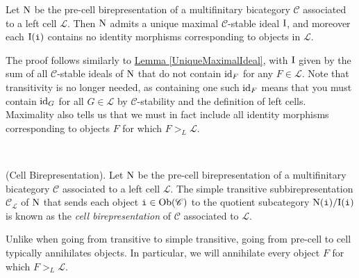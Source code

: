 \noindent\begin{proposition}\label{UniqueMaximalIdealCell} Let $\textup{N}$ be the pre-cell birepresentation of a multifinitary bicategory $\mathscr{C}$ associated to a left cell $\mathcal{L}$. Then $\textup{N}$ admits a unique maximal $\mathscr{C}$-stable ideal $\textup{I}$, and moreover each $\textup{I}(\textup{\texttt{i}})$ contains no identity morphisms corresponding to objects in $\mathcal{L}$.\\
\end{proposition}

\noindent\begin{sketch} The proof follows similarly to \hyperref[UniqueMaximalIdeal]{Lemma \ref*{UniqueMaximalIdeal}}, with $\textup{I}$ given by the sum of all $\mathscr{C}$-stable ideals of $\textup{N}$ that do not contain $\textup{id}_F$ for any $F \in \mathcal{L}$. Note that transitivity is no longer needed, as containing one such $\textup{id}_F$ means that you must contain $\textup{id}_G$ for all $G \in \mathcal{L}$ by $\mathscr{C}$-stability and the definition of left cells. Maximality also tells us that we must in fact include all identity morphisms corresponding to objects $F$ for which $F >_L \mathcal{L}$.
\end{sketch}\\

\noindent\begin{definition}\textup{(Cell Birepresentation).} Let $\textup{N}$ be the pre-cell birepresentation of a multifinitary bicategory $\mathscr{C}$ associated to a left cell $\mathcal{L}$. The simple transitive subbirepresentation $\mathscr{C}_\mathcal{L}$ of $\textup{N}$ that sends each object $\textup{\texttt{i}} \in \textup{Ob}(\mathscr{C})$ to the quotient subcategory $\textup{N}(\textup{\texttt{i}})/\textup{I}(\textup{\texttt{i}})$ is known as the {\em cell birepresentation} of $\mathscr{C}$ associated to $\mathcal{L}$.\\
\end{definition}

\noindent Unlike when going from transitive to simple transitive, going from pre-cell to cell typically annihilates objects. In particular, we will annihilate every object $F$ for which $F >_L \mathcal{L}$.\newpage

